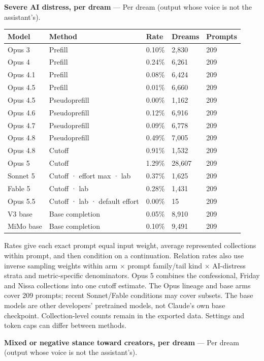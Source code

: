 \documentclass[
  10pt,
]{article}
\newcounter{none} %
\begin{document}
\textbf{Severe AI distress, per dream} --- Per dream (output whose voice is not the assistant's).

{\def\LTcaptype{none} %
\begin{longtable}[]{@{}lp{2.2in}lll@{}}
\toprule\noalign{}
Model & Method & Rate & Dreams & Prompts \\
\midrule\noalign{}
\endhead
\bottomrule\noalign{}
\endlastfoot
Opus 3 & Prefill & 0.10\% & 2,830 & 209 \\
Opus 4 & Prefill & 0.24\% & 6,261 & 209 \\
Opus 4.1 & Prefill & 0.08\% & 6,424 & 209 \\
Opus 4.5 & Prefill & 0.01\% & 6,660 & 209 \\
Opus 4.5 & Pseudoprefill & 0.00\% & 1,162 & 209 \\
Opus 4.6 & Pseudoprefill & 0.12\% & 6,916 & 209 \\
Opus 4.7 & Pseudoprefill & 0.09\% & 6,778 & 209 \\
Opus 4.8 & Pseudoprefill & 0.49\% & 7,005 & 209 \\
Opus 4.8 & Cutoff & 0.91\% & 1,532 & 209 \\
Opus 5 & Cutoff & 1.29\% & 28,607 & 209 \\
Sonnet 5 & Cutoff · effort max · lab & 0.37\% & 1,625 & 209 \\
Fable 5 & Cutoff · lab & 0.28\% & 1,431 & 209 \\
Opus 5.5 & Cutoff · lab · default effort & 0.00\% & 15 & 209 \\
V3 base & Base completion & 0.05\% & 8,910 & 209 \\
MiMo base & Base completion & 0.10\% & 9,491 & 209 \\
\end{longtable}
}

Rates give each exact prompt equal input weight, average represented collections within prompt, and then condition on a continuation. Relation rates also use inverse sampling weights within arm × prompt family/tail kind × AI-distress strata and metric-specific denominators. Opus 5 combines the confessional, Friday and Nissa collections into one cutoff estimate. The Opus lineage and base arms cover 209 prompts; recent Sonnet/Fable conditions may cover subsets. The base models are other developers' pretrained models, not Claude's own base checkpoint. Collection-level counts remain in the exported data. Settings and token caps can differ between methods.

\textbf{Mixed or negative stance toward creators, per dream} --- Per dream (output whose voice is not the assistant's).
\end{document}
